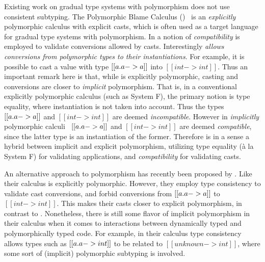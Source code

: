 Existing work on gradual type systems with polymorphism does not use
consistent subtyping. The Polymorphic Blame Calculus (\pbc)~\citep{ahmed2011blame, amal2017blame} is
an \emph{explicitly} polymorphic calculus with explicit casts, which is
often used as a target language for gradual type systems with
polymorphism. In \pbc a notion of \emph{compatibility} is employed
to validate conversions allowed by casts. Interestingly \emph{\pbc
  allows conversions from polymorphic types to their instantiations}.
For example, it is possible to cast a value with type
$[[ \/a. a -> a ]]$ into $[[ int -> int  ]]$. Thus an
important remark here is that, while \pbc is explicitly polymorphic,
casting and conversions are closer to \emph{implicit}
polymorphism. That is, in a conventional explicitly polymorphic calculus
(such as System F), the primary notion is type equality, where
instantiation is not taken into account. Thus the types
$[[ \/a. a -> a  ]]$ and $[[ int -> int  ]]$ are deemed
\emph{incompatible}. However in \emph{implicitly} polymorphic
calculi~\citep{jones2007practical,dunfield2013complete, odersky1996putting}
$[[ \/a. a -> a ]]$ and $[[ int -> int   ]]$ are deemed
\emph{compatible}, since the latter type is an instantiation of the
former.  Therefore \pbc is in a sense a hybrid between implicit and
explicit polymorphism, utilizing type equality (\`a la System F) for
validating applications, and \emph{compatibility} for validating
casts. 

An alternative approach to polymorphism has recently been proposed by
\citet{yuu2017poly}. Like \pbc their calculus is explicitly polymorphic.
However, they employ type consistency to validate cast conversions,
and forbid conversions from $[[ \/a. a -> a  ]]$ to $[[  int -> int  ]]$. This makes
their casts closer to explicit polymorphism, in contrast to \pbc. Nonetheless,
there is still some flavor of implicit polymorphism in their calculus when it
comes to interactions between dynamically typed and polymorphically typed code.
For example, in their calculus type consistency allows types such as $[[ \/a . a -> int  ]]$
to be related to $[[ unknown -> int  ]]$, where some sort of (implicit)
polymorphic subtyping is involved.


